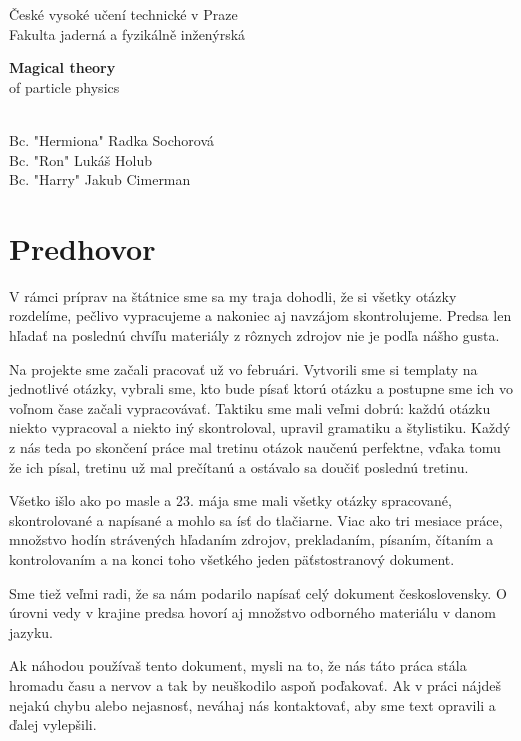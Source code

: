 \documentclass[12pt]{book}
\def\mfrok{2018}
\def\hermiona{Bc. "Hermiona" Radka Sochorová}
\def\ron{Bc. "Ron" Lukáš Holub}
\def\harry{Bc. "Harry" Jakub Cimerman}
\begin{document}
     

\thispagestyle{empty}

\begin{center}
\sc\large
České vysoké učení technické v Praze\\
Fakulta jaderná a fyzikálně inženýrská

\vfill

{\Huge\textbf{Magical theory}\\ \vspace{0.2cm}
\Large of particle physics}
\end{center}

\vfill

{\sc\large 
\noindent \mfrok\\
\hermiona \\
\ron \\
\harry
}

\eject %


\newpage

\chapter*{Predhovor}

V rámci príprav na štátnice sme sa my traja dohodli, že si všetky otázky rozdelíme, pečlivo vypracujeme a nakoniec aj navzájom skontrolujeme. Predsa len hľadať na poslednú chvíľu materiály z rôznych zdrojov nie je podľa nášho gusta. 

Na projekte sme začali pracovať už vo februári. Vytvorili sme si templaty na jednotlivé otázky, vybrali sme, kto bude písať ktorú otázku a postupne sme ich vo voľnom čase začali vypracovávať. Taktiku sme mali veľmi dobrú: každú otázku niekto vypracoval a niekto iný skontroloval, upravil gramatiku a štylistiku. Každý z nás teda po skončení práce mal tretinu otázok naučenú perfektne, vďaka tomu že ich písal, tretinu už mal prečítanú a ostávalo sa doučiť poslednú tretinu.

Všetko išlo ako po masle a 23. mája sme mali všetky otázky spracované, skontrolované a napísané a mohlo sa ísť do tlačiarne. Viac ako tri mesiace práce, množstvo hodín strávených hľadaním zdrojov, prekladaním, písaním, čítaním a kontrolovaním a na konci toho všetkého jeden päťstostranový dokument. 

Sme tiež veľmi radi, že sa nám podarilo napísať celý dokument československy. O úrovni vedy v krajine predsa hovorí aj množstvo odborného materiálu v danom jazyku.

Ak náhodou používaš tento dokument, mysli na to, že nás táto práca stála hromadu času a nervov a tak by neuškodilo aspoň poďakovať. Ak v práci nájdeš nejakú chybu alebo nejasnosť, neváhaj nás kontaktovať, aby sme text opravili a ďalej vylepšili.
\end{document}
